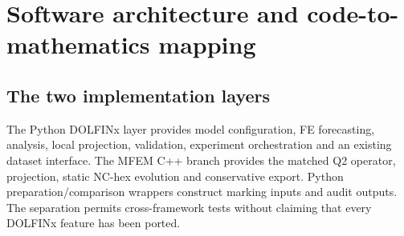 \chapter{Software architecture and code-to-mathematics mapping}
\section{The two implementation layers}
The Python DOLFINx layer provides model configuration, FE forecasting, analysis, local projection, validation, experiment orchestration and an existing dataset interface. The MFEM C++ branch provides the matched Q2 operator, projection, static NC-hex evolution and conservative export. Python preparation/comparison wrappers construct marking inputs and audit outputs. The separation permits cross-framework tests without claiming that every DOLFINx feature has been ported.

